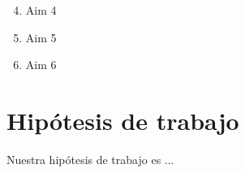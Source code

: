   \begin{enumerate}
    \setcounter{enumi}{3}

    \item Aim 4
    \item Aim 5
    \item Aim 6

  \end{enumerate}




\section{Hipótesis de trabajo}\label{sec:hipotesis}

Nuestra hipótesis de trabajo es ... 